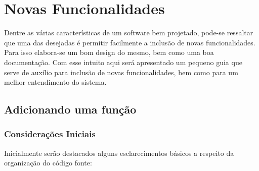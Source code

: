 \chapter{Novas Funcionalidades} \label{howTo}

Dentre as várias características de um software bem projetado, pode-se ressaltar que uma das desejadas é permitir facilmente a inclusão de novas funcionalidades. Para isso elabora-se um bom design do mesmo, bem como uma boa documentação. Com esse intuito aqui será apresentado um pequeno guia que serve de auxílio para inclusão de novas funcionalidades, bem como para um melhor entendimento do sistema.

\section{Adicionando uma função}

\subsection{Considerações Iniciais}

Inicialmente serão destacados alguns esclarecimentos básicos a respeito da organização do código fonte:

